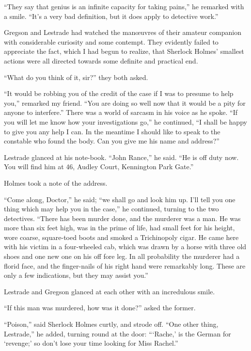 \documentclass[12pt,english,oneside]{book}
\begin{document}
{}``They say that genius is an infinite capacity for taking pains,''
he remarked with a smile. {}``It's a very bad definition, but it
does apply to detective work.''

Gregson and Lestrade had watched the man\oe uvres of their amateur
companion with considerable curiosity and some contempt. They evidently
failed to appreciate the fact, which I had begun to realize, that
Sherlock Holmes' smallest actions were all directed towards some definite
and practical end.

{}``What do you think of it, sir?'' they both asked.

{}``It would be robbing you of the credit of the case if I was to
presume to help you,'' remarked my friend. {}``You are doing so
well now that it would be a pity for anyone to interfere.'' There
was a world of sarcasm in his voice as he spoke. {}``If you will
let me know how your investigations go,'' he continued, {}``I shall
be happy to give you any help I can. In the meantime I should like
to speak to the constable who found the body. Can you give me his
name and address?''

Lestrade glanced at his note-book. {}``John Rance,'' he said. {}``He
is off duty now. You will find him at 46, Audley Court, Kennington
Park Gate.''

Holmes took a note of the address.

{}``Come along, Doctor,'' he said; {}``we shall go and look him
up. I'll tell you one thing which may help you in the case,'' he
continued, turning to the two detectives. {}``There has been murder
done, and the murderer was a man. He was more than six feet high,
was in the prime of life, had small feet for his height, wore coarse,
square-toed boots and smoked a Trichinopoly cigar. He came here with
his victim in a four-wheeled cab, which was drawn by a horse with
three old shoes and one new one on his off fore leg. In all probability
the murderer had a florid face, and the finger-nails of his right
hand were remarkably long. These are only a few indications, but they
may assist you.''

Lestrade and Gregson glanced at each other with an incredulous smile.

{}``If this man was murdered, how was it done?'' asked the former.

{}``Poison,'' said Sherlock Holmes curtly, and strode off. {}``One
other thing, Lestrade,'' he added, turning round at the door: {}```Rache,'
is the German for `revenge;' so don't lose your time looking for Miss
Rachel.''
\end{document}
